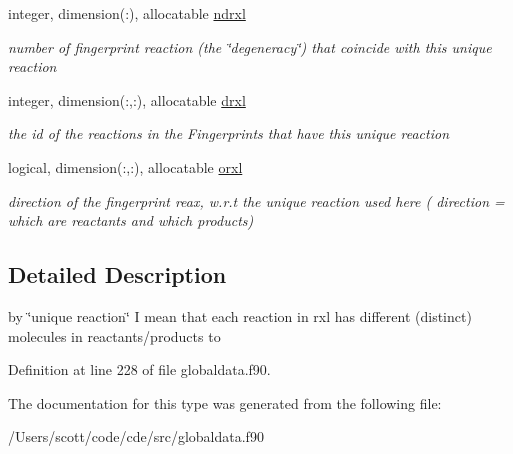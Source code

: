 \begin{DoxyCompactItemize}
\mbox{\label{structglobaldata_1_1moldata_a270e18949ddf76d06d87ccff551b8e52}} 
integer, dimension(\+:), allocatable \mbox{\hyperlink{structglobaldata_1_1moldata_a270e18949ddf76d06d87ccff551b8e52}{ndrxl}}
\begin{DoxyCompactList}\small\item\em number of fingerprint reaction (the \char`\"{}degeneracy\char`\"{}) that coincide with this unique reaction \end{DoxyCompactList}\item 
\mbox{\label{structglobaldata_1_1moldata_a5474497ab7b3c38aae4e3c2ca755b302}} 
integer, dimension(\+:,\+:), allocatable \mbox{\hyperlink{structglobaldata_1_1moldata_a5474497ab7b3c38aae4e3c2ca755b302}{drxl}}
\begin{DoxyCompactList}\small\item\em the id of the reactions in the Fingerprints that have this unique reaction \end{DoxyCompactList}\item 
\mbox{\label{structglobaldata_1_1moldata_a6f91b48fec5a81129b9fdcc060ec93ad}} 
logical, dimension(\+:,\+:), allocatable \mbox{\hyperlink{structglobaldata_1_1moldata_a6f91b48fec5a81129b9fdcc060ec93ad}{orxl}}
\begin{DoxyCompactList}\small\item\em direction of the fingerprint reax, w.\+r.\+t the unique reaction used here ( direction = which are reactants and which products) \end{DoxyCompactList}\end{DoxyCompactItemize}


\subsection{Detailed Description}
by \char`\"{}unique reaction\char`\"{} I mean that each reaction in rxl has different (distinct) molecules in reactants/products to 

Definition at line 228 of file globaldata.\+f90.



The documentation for this type was generated from the following file\+:\begin{DoxyCompactItemize}
\item 
/\+Users/scott/code/cde/src/globaldata.\+f90\end{DoxyCompactItemize}
